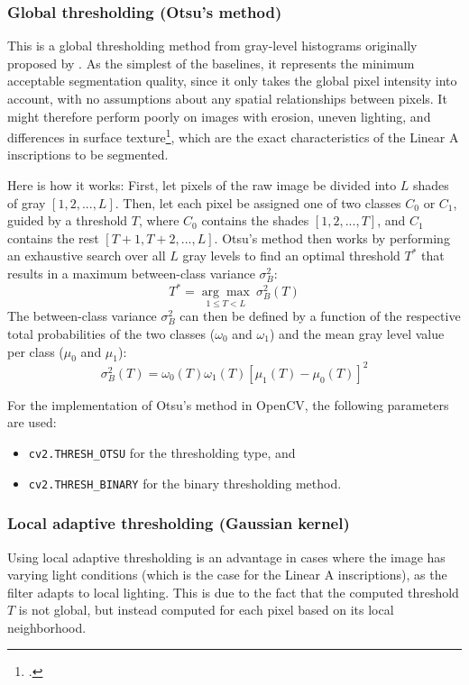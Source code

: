 \subsubsection{Global thresholding (Otsu's method)}
This is a global thresholding method from gray-level histograms originally proposed by \textcite{Otsu1979}.
As the simplest of the baselines, it represents the minimum acceptable segmentation quality, since it only takes the global pixel intensity into account, with no assumptions about any spatial relationships between pixels.
It might therefore perform poorly on images with erosion, uneven lighting, and differences in surface texture\footcite[p.~751]{DigitalImageProcessing}, which are the exact characteristics of the Linear A inscriptions to be segmented.

Here is how it works:
First, let pixels of the raw image be divided into $L$ shades of gray $[1,2,...,L]$.
Then, let each pixel be assigned one of two classes $C_0$ or $C_1$, guided by a threshold $T$,
 where $C_0$ contains the shades $[1,2,...,T]$, and $C_1$ contains the rest $[T+1,T+2,...,L]$.
Otsu's method then works by performing an exhaustive search over all $L$ gray levels to find an optimal threshold $T^{*}$ that results in a maximum between-class variance $\sigma^2_B$:
$$ T^{*} = \underset{1 \leq T < L}{\arg \max} ~ \sigma^2_B(T) $$
The between-class variance $\sigma^2_B$ can then be defined by a function of the respective total probabilities of the two classes ($\omega_0$ and $\omega_1$) and the mean gray level value per class ($\mu_0$ and $\mu_1$):
 $$ \sigma^2_B(T) = \omega_0(T) \omega_1(T) [\mu_1(T)-\mu_0(T)]^2$$

\noindent For the implementation of Otsu's method in OpenCV, the following parameters are used: 
\begin{itemize}
    \item \texttt{cv2.THRESH\_OTSU} for the thresholding type, and
    \item \texttt{cv2.THRESH\_BINARY} for the binary thresholding method.
\end{itemize}

\subsubsection{Local adaptive thresholding (Gaussian kernel)}
Using local adaptive thresholding is an advantage in cases where the image has varying light conditions (which is the case for the Linear A inscriptions), as the filter adapts to local lighting.
This is due to the fact that the computed threshold $T$ is not global, but instead computed for each pixel based on its local neighborhood.

